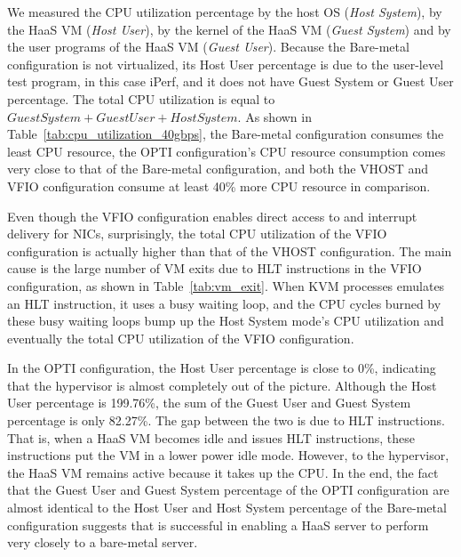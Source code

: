 We measured the CPU utilization percentage by the host OS ({\em Host System}),
by the HaaS VM ({\em Host User}), by the kernel of the HaaS VM ({\em Guest System})
and by the user programs of the HaaS VM ({\em Guest User}).
Because  the Bare-metal configuration is not virtualized, its Host User percentage is due to 
the user-level test program, in this case iPerf, and it does not have Guest System or 
Guest User percentage.
The total CPU utilization is equal to $Guest System + Guest User + Host System$.
As shown in Table~\ref{tab:cpu_utilization_40gbps}, 
the Bare-metal configuration consumes the least CPU resource,  
the OPTI configuration's CPU resource consumption comes very close to that of the Bare-metal configuration,
and both the VHOST and VFIO configuration consume at least 40\% more CPU resource in comparison.

Even though the VFIO configuration enables direct access to and interrupt delivery for NICs,
surprisingly, the total CPU utilization of the VFIO configuration is actually higher than that of 
the VHOST configuration. The main cause is the large number of VM exits due to HLT instructions in the VFIO configuration, as shown in Table~\ref{tab:vm_exit}. When KVM processes emulates an HLT instruction, it uses a busy waiting loop, and the CPU cycles burned by these busy waiting loops bump up the Host System mode's CPU utilization and eventually the total CPU utilization of the VFIO configuration.



In the OPTI configuration, the Host User percentage is close to 0\%, indicating that the hypervisor is almost 
completely out of the picture. Although the Host User percentage is 199.76\%, the sum of the Guest User and
Guest System percentage is only 82.27\%. The gap between the two is due to HLT instructions.
That is, when a HaaS VM becomes idle and issues HLT instructions, these instructions put the VM in a lower power
idle mode. However, to the hypervisor, the HaaS VM remains active because it takes up the CPU.
In the end, the fact that the Guest User and Guest System percentage of the OPTI configuration are almost 
identical to the Host User and Host System percentage of the Bare-metal configuration suggests that \na is successful in enabling a HaaS server
to perform very closely to a bare-metal server.

